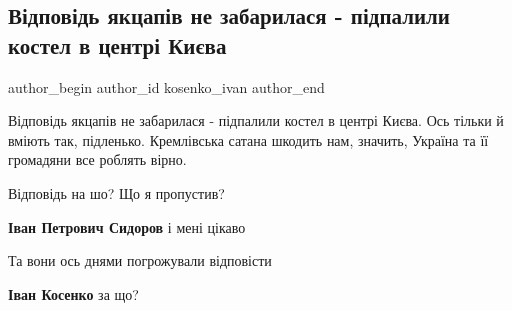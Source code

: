  
 
 
 
 
 
\subsection{Відповідь якцапів не забарилася - підпалили костел в центрі Києва}
\label{sec:03_09_2021.fb.kosenko_ivan.1.kostel_kacapy_kiev}
 
\ifcmt
 author_begin
   author_id kosenko_ivan
 author_end
\fi

Відповідь якцапів не забарилася - підпалили костел в центрі Києва. Ось тільки й
вміють так, підленько. Кремлівська сатана шкодить нам, значить, Україна та її
громадяни все роблять вірно.

\begin{itemize} %
Відповідь на шо?
Що я пропустив?

\textbf{Іван Петрович Сидоров} і мені цікаво

Та вони ось днями погрожували відповісти

\textbf{Іван Косенко} за що?
\end{itemize} %
